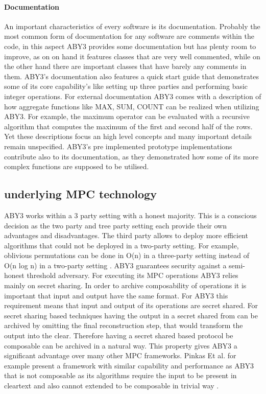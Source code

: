 \paragraph{Documentation} 
An important characteristics of every software is its documentation. 
Probably the most common form of documentation for any software are comments within the code, in this aspect ABY3 provides some documentation but has plenty room to improve, as on on hand it features classes that are very well commented, while on the other hand there are important classes that have barely any comments in them. 
ABY3's documentation also features a quick start guide that demonstrates some of its core capability's like setting up three parties and performing basic integer operations.
For external documentation ABY3 comes with a description of how aggregate functions like MAX, SUM, COUNT can be realized when utilizing ABY3. For example, the maximum operator can be evaluated with a recursive algorithm that computes the maximum of the first and second half of the rows. Yet these descriptions focus an high level concepts and many important details remain unspecified. ABY3's pre implemented prototype implementations contribute also to its documentation, as they demonstrated how some of its more complex functions are supposed to be utilised.


\subsection{underlying MPC technology}
ABY3 works within a 3 party setting with a honest majority. This is a conscious decision as the two party and tree party setting each provide their own advantages and disadvantages.
The third party allows to deploy more efficient algorithms that could not be deployed in a two-party setting. For example, oblivious permutations can be done in O(n) in a three-party setting instead of O(n log n) in a two-party setting \cite{aby3}.
 ABY3 guarantees security against a semi-honest threshold adversary. For executing its MPC operations ABY3 relies mainly on secret sharing. In order to archive composability of operations it is important that input and output have the same format. For ABY3 this requirement means that input and output of its operations are secret shared. For secret sharing based techniques having the output in a secret shared from can be archived by omitting the final  reconstruction step, that would transform the output into the clear. Therefore having a secret shared based protocol be composable can be archived in a natural way. This property gives ABY3 a significant advantage over many other MPC frameworks. Pinkas Et al. \cite{pinkas2014faster} for example present a framework with similar capability and performance as ABY3 that is not composable as its algorithms require the input to be present in cleartext and also cannot extended to be composable in trivial way \cite{aby3}.      
  
